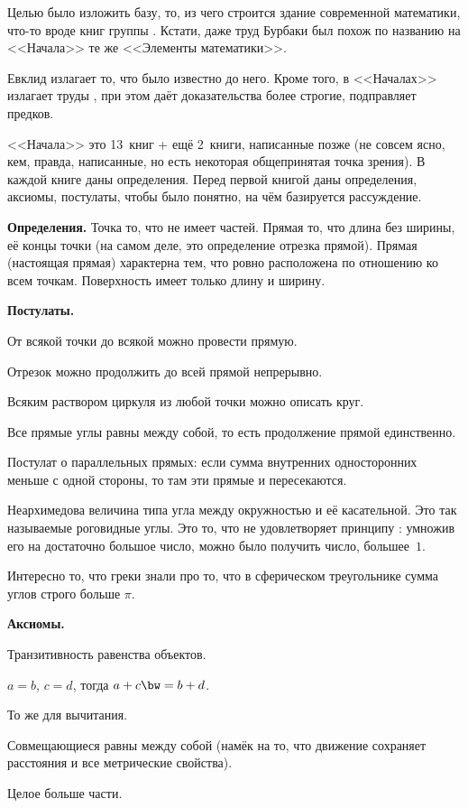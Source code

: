 \documentclass[a4paper,oneside,fleqn,10pt]{article}
\begin{document}
Целью  было изложить базу, то, из чего строится
здание современной математики, что-то вроде книг группы
.  Кстати, даже труд Бурбаки был похож по названию на
<<Начала>> те же <<Элементы математики>>.

Евклид излагает то, что было известно до него. Кроме того, в
<<Началах>>  излагает труды , при
этом даёт доказательства более строгие, подправляет предков.

<<Начала>> это 13~книг + ещё 2~книги, написанные позже (не совсем
ясно, кем, правда, написанные, но есть некоторая общепринятая точка
зрения). В каждой книге даны определения.  Перед первой книгой даны
определения, аксиомы, постулаты, чтобы было понятно, на чём базируется
рассуждение.

\textbf{Определения.}  Точка то, что не имеет частей.  Прямая то, что
длина без ширины, её концы точки (на самом деле, это определение
отрезка прямой).  Прямая (настоящая прямая) характерна тем, что ровно
расположена по отношению ко всем точкам.  Поверхность имеет только
длину и ширину.

\textbf{Постулаты.}

\begin{nums}{-2}
\item От всякой точки до всякой можно провести прямую.
\item Отрезок можно продолжить до всей прямой непрерывно.
\item Всяким раствором циркуля из любой точки можно описать круг.
\item Все прямые углы равны между собой, то есть продолжение прямой
  единственно.
\item Постулат о параллельных прямых: если сумма внутренних
  односторонних меньше с одной стороны, то там эти прямые и
  пересекаются.
\end{nums}

Неархимедова величина типа угла между окружностью и её касательной.
Это так называемые роговидные углы. Это то, что не удовлетворяет
принципу : умножив его на достаточно большое
число, можно было получить число, большее~$1$.

Интересно то, что греки знали про то, что в сферическом треугольнике
сумма углов строго больше $\pi$.

\textbf{Аксиомы.}
\begin{nums}{-2}
\item Транзитивность равенства объектов.
\item ${a=b}$, ${c=d}$, тогда $a+c\bw=b+d$.
\item То же для вычитания.
\item Совмещающиеся равны между собой (намёк на то, что движение
  сохраняет расстояния и все метрические свойства).
\item Целое больше части.
\end{nums}
\end{document}
